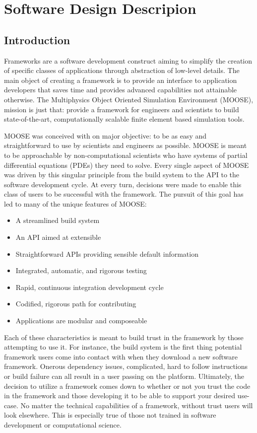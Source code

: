 \documentclass{INLreport}
\begin{document}
\section{Software Design Descripion}

\subsection{Introduction}
Frameworks are a software development construct aiming to simplify the creation of specific classes of applications
through abstraction of low-level details. The main object of creating a framework is to provide an interface to
application developers that saves time and provides advanced capabilities not attainable otherwise. The Multiphysics
Object Oriented Simulation Environment (MOOSE), mission is just that: provide a framework for engineers and scientists
to build state-of-the-art, computationally scalable finite element based simulation tools.

MOOSE was conceived with on major objective: to be as easy and straightforward to use by scientists and engineers as possible.
MOOSE is meant to be approachable by non-computational scientists who have systems of partial differential equations (PDEs) they need to solve. Every single aspect of MOOSE was driven by this singular principle from the build system to the API to the software development cycle.  At every turn, decisions were made to enable this class of users to be successful with the framework.  The pursuit of this goal has led to many of the unique features of MOOSE:

\begin{itemize}
  \item A streamlined build system
  \item An API aimed at extensible
  \item Straightforward APIs providing sensible default information
  \item Integrated, automatic, and rigorous testing
  \item Rapid, continuous integration development cycle
  \item Codified, rigorous path for contributing
  \item Applications are modular and composeable
\end{itemize}

Each of these characteristics is meant to build trust in the framework by those attempting to use it. For instance,
the build system is the first thing potential framework users come into contact with when they download a new
software framework. Onerous dependency issues, complicated, hard to follow instructions or build failure can all
result in a user passing on the platform. Ultimately, the decision to utilize a framework comes down to whether or
not you trust the code in the framework and those developing it to be able to support your desired use-case.
No matter the technical capabilities of a framework, without trust users will look elsewhere. This is especially
true of those not trained in software development or computational science.
\end{document}
